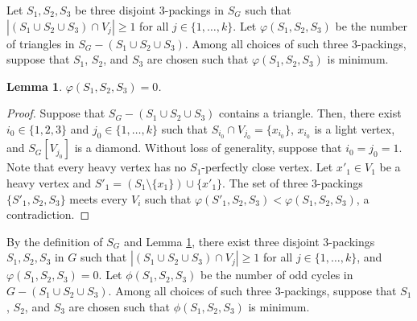 \documentclass[12pt, oneside]{scrartcl}
\newtheorem{lemma}{Lemma}%
\begin{document}
Let $S_1,S_2,S_3$ be three disjoint $3$-packings in $S_G$ such that $|(S_1\cup S_2\cup S_3)\cap V_j|\geq 1$ for all $j\in \{1,\dots ,k\}$. Let $\varphi(S_1,S_2,S_3)$ be the number of triangles in $S_G-(S_1\cup S_2\cup S_3)$. Among all choices of such three $3$-packings, suppose that $S_1$, $S_2$, and $S_3$ are chosen such that $\varphi(S_1,S_2,S_3)$ is minimum.

\begin{lemma}\label{l10}
    $\varphi(S_1,S_2,S_3)=0$.
\end{lemma}
\begin{proof}
    Suppose that $S_G-(S_1\cup S_2\cup S_3)$ contains a triangle. Then, there exist $i_0\in \{1,2,3\}$ and $j_0\in \{1,\dots ,k\}$ such that $S_{i_0}\cap V_{j_0}=\{x_{i_0}\}$, $x_{i_0}$ is a light vertex, and $S_G[V_{j_0}]$ is a diamond. Without loss of generality, suppose that $i_0=j_0=1$. Note that every heavy vertex has no $S_1$-perfectly close vertex. Let $x'_1\in V_1$ be a heavy vertex and $S'_1=(S_1\setminus \{x_1\})\cup \{x'_1\}$. The set of three $3$-packings $\{S'_1,S_2,S_3\}$ meets every $V_i$ such that $\varphi(S'_1,S_2,S_3)<\varphi(S_1,S_2,S_3)$, a contradiction.
\end{proof}

By the definition of $S_G$ and Lemma \ref{l10}, there exist three disjoint $3$-packings $S_1,S_2,S_3$ in $G$ such that $|(S_1\cup S_2\cup S_3)\cap V_j|\geq 1$ for all $j\in \{1,\dots ,k\}$, and $\varphi(S_1,S_2,S_3)=0$. Let $\phi(S_1,S_2,S_3)$ be the number of odd cycles in $G-(S_1\cup S_2\cup S_3)$. Among all choices of such three $3$-packings, suppose that $S_1$, $S_2$, and $S_3$ are chosen such that $\phi(S_1,S_2,S_3)$ is minimum.
\end{document}
